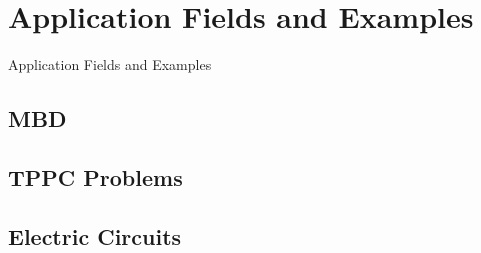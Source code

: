 
\section{Application Fields and Examples}

\begin{frame}
  \tableofcontents[currentsection]
\end{frame}

\begin{frame}{Application Fields and Examples}{}
\end{frame}

\subsection{\acl{MBD}}

\subsection{\acl{TPPC} Problems}

\subsection{Electric Circuits}


